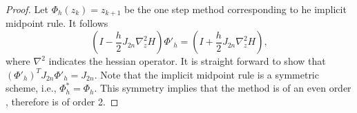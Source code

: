 \begin{proof}
Let $\Phi_h(z_k) = z_{k+1}$ be the one step method corresponding to he implicit midpoint rule. It follows 
\begin{equation*}
	(I - \frac h 2 J_{2n} \nabla^2_z H) \Phi'_h = (I + \frac{h}{2} J_{2n} \nabla^2_z H),
\end{equation*}
where $\nabla^2$ indicates the hessian operator. It is straight forward to show that $(\Phi'_h)^T J_{2n} \Phi'_h = J_{2n} $. Note that the implicit midpoint rule is a symmetric scheme, i.e., $\Phi^*_h = \Phi_h$. This symmetry implies that the method is of an even order \cite{hairer2006geometric}, therefore is of order 2.
\end{proof}

